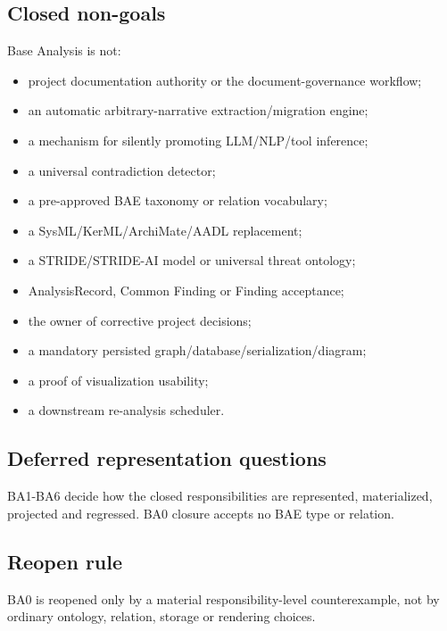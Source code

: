 \documentclass[
  10pt,
]{article}
\providecommand{\tightlist}{%
  \setlength{\itemsep}{0pt}\setlength{\parskip}{0pt}}
\begin{document}
\subsection{Closed non-goals}\label{closed-non-goals}

Base Analysis is not:

\begin{itemize}
\tightlist
\item
  project documentation authority or the document-governance workflow;
\item
  an automatic arbitrary-narrative extraction/migration engine;
\item
  a mechanism for silently promoting LLM/NLP/tool inference;
\item
  a universal contradiction detector;
\item
  a pre-approved BAE taxonomy or relation vocabulary;
\item
  a SysML/KerML/ArchiMate/AADL replacement;
\item
  a STRIDE/STRIDE-AI model or universal threat ontology;
\item
  AnalysisRecord, Common Finding or Finding acceptance;
\item
  the owner of corrective project decisions;
\item
  a mandatory persisted graph/database/serialization/diagram;
\item
  a proof of visualization usability;
\item
  a downstream re-analysis scheduler.
\end{itemize}

\subsection{Deferred representation
questions}\label{deferred-representation-questions}

BA1-BA6 decide how the closed responsibilities are represented,
materialized, projected and regressed. BA0 closure accepts no BAE type
or relation.

\subsection{Reopen rule}\label{reopen-rule}

BA0 is reopened only by a material responsibility-level counterexample,
not by ordinary ontology, relation, storage or rendering choices.
\end{document}
